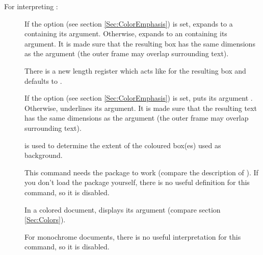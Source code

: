   \newslide

  For interpreting :
  \begin{description}
  \item[] If the  option (see section \ref{Sec:ColorEmphasis})
    is set, expands to a  containing its argument. Otherwise, expands to an
     containing its argument. It is made sure that the resulting box has the same dimensions as the
    argument (the outer frame may overlap surrounding text).
    
    There is a new length register  which acts like  for the
    resulting box and defaults to .
    
    \newslide
    
  \item[{}] If the  option (see section
    \ref{Sec:ColorEmphasis}) is set, puts its argument . Otherwise, underlines its
    argument. It is made sure that the resulting text has the same dimensions as the argument (the outer frame may
    overlap surrounding text).
    
     is used to determine the extent of the coloured box(es) used as background. 
    
    This command needs the \href{ftp://ftp.dante.de/tex-archive/help/Catalogue/entries/soul.html}{} package
    to work (compare the description of ). If you don't load the  package yourself, there
    is no useful definition for this command, so it is disabled.
    
    \newslide
    
  \item[] In a colored document, displays its argument  (compare section \ref{Sec:Colors}).

    For monochrome documents, there is no useful interpretation for this command, so it is disabled.
  \end{description}

  \newslide

